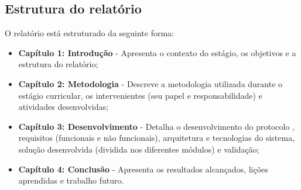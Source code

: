 \subsection{Estrutura do relatório}
O relatório está estruturado da seguinte forma:
\begin{itemize}
    \item \textbf{Capítulo 1: Introdução} - Apresenta o contexto do estágio, os objetivos e a estrutura do relatório;
    \item \textbf{Capítulo 2: Metodologia} - Descreve a metodologia utilizada durante o estágio curricular,
    os intervenientes (seu papel e responsabilidade) e atividades desenvolvidas;
    \item \textbf{Capítulo 3: Desenvolvimento} - Detalha o desenvolvimento do protocolo , requisitos (funcionais e não funcionais), 
    arquitetura e tecnologias do sistema, solução desenvolvida (dividida nos diferentes módulos) e validação;
    \item \textbf{Capítulo 4: Conclusão} - Apresenta os resultados alcançados, lições aprendidas e trabalho futuro.
\end{itemize}
